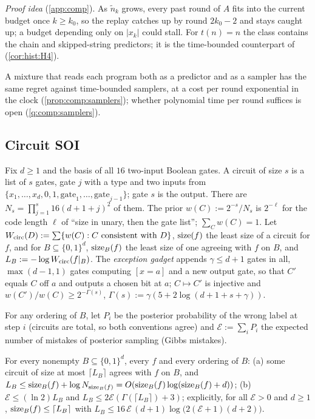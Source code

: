 \emph{Proof idea} (\cref{app:comp}). As $\tilde n_k$ grows, every past round of $A$ fits into the current budget once $k\ge k_0$, so the replay catches up by round $2k_0-2$ and stays caught up; a budget depending only on $|x_k|$ could stall. For $t(n)=n$ the class contains the chain and skipped-string predictors; it is the time-bounded counterpart of \SFIhist{} (\cref{cor:hist:H4}).

A mixture that reads each program both as a predictor and as a sampler has the same regret against time-bounded samplers, at a cost per round exponential in the clock (\cref{prop:comp:samplers}); whether polynomial time per round suffices is open (\cref{q:comp:samplers}).

\subsection{Circuit SOI}\label{sec:comp:circuits}

\begin{definition}\label{def:comp:circuits}
Fix $d\ge1$ and the basis of all $16$ two-input Boolean gates. A circuit of size $s$ is a list of $s$ gates, gate $j$ with a type and two inputs from $\{x_1,\dots,x_d,0,1,\mathrm{gate}_1,\dots,\mathrm{gate}_{j-1}\}$; gate $s$ is the output. There are $N_s=\prod_{j=1}^s16(d+1+j)^2$ of them. The prior $w(C):=2^{-s}/N_s$ is $2^{-\ell}$ for the code length $\ell$ of ``size in unary, then the gate list''; $\sum_Cw(C)=1$. Let $W_{\mathrm{circ}}(D):=\sum\{w(C):C\text{ consistent with }D\}$, $\operatorname{size}(f)$ the least size of a circuit for $f$, and for $B\subseteq\{0,1\}^d$, $\operatorname{size}_B(f)$ the least size of one agreeing with $f$ on $B$, and $L_B:=-\log W_{\mathrm{circ}}(f|_B)$. The \emph{exception gadget} appends $\gamma\le d+1$ gates in all, $\max(d-1,1)$ gates computing $[x=a]$ and a new output gate, so that $C'$ equals $C$ off $a$ and outputs a chosen bit at $a$; $C\mapsto C'$ is injective and $w(C')/w(C)\ge2^{-\Gamma(s)}$, $\Gamma(s):=\gamma(5+2\log(d+1+s+\gamma))$.
\end{definition}

For any ordering of $B$, let $P_i$ be the posterior probability of the wrong label at step $i$ (circuits are total, so both conventions agree) and $\mathcal E:=\sum_iP_i$ the expected number of mistakes of posterior sampling (Gibbs mistakes).

\begin{theorem}\label{thm:comp:circuitbayes}
For every nonempty $B\subseteq\{0,1\}^d$, every $f$ and every ordering of $B$:
(a) some circuit of size at most $\lceil L_B\rceil$ agrees with $f$ on $B$, and $L_B\le\operatorname{size}_B(f)+\log N_{\operatorname{size}_B(f)}=O(\operatorname{size}_B(f)\log(\operatorname{size}_B(f)+d))$;
(b) $\mathcal E\le(\ln2)L_B$ and $L_B\le2\mathcal E(\Gamma(\lceil L_B\rceil)+3)$; explicitly, for all $\mathcal E>0$ and $d\ge1$,
$\operatorname{size}_B(f)\le\lceil L_B\rceil$ with $L_B\le16\,\mathcal E\,(d+1)\log\big(2(\mathcal E+1)(d+2)\big)$.
\end{theorem}

